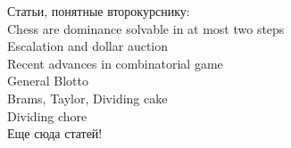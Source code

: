 \documentclass[pdftex,12pt,a4paper]{article}
\begin{document}
Статьи, понятные второкурснику: \\
Chess are dominance solvable in at most two steps \\
Escalation and dollar auction \\
Recent advances in combinatorial game \\
General Blotto \\
Brams, Taylor, Dividing cake \\
Dividing chore \\

Еще сюда статей!



\newpage
\begin{comment}
\section{Ответы}

1.4. а) нет б) да (рисунок) \\
1.5. одну \\

1.8. а) верно б) неверно в) неверно \\
1.9. 7:1 \\

2.1. а) $t_{2}$ \\
2.5. возможная матрица: $\begin{array}{c|cc}
& + & - \\
\hline
+ & (0;0) & (1;-1) \\
- & (-1;1) & (0;0) \\
\end{array}$, NE - $(+;+)$ \\
Мораль: можно добится нужного исхода голосования пообещав деньги, но не выплачивая ни копейки. \\
2.7. $u_{1}(x_{1},x_{2})=\frac{3}{4}(x_{1}+x_{2})-x_{1}$ \\
$u_{2}(x_{1},x_{2})=\frac{3}{4}(x_{1}+x_{2})-x_{2}$ \\
NE - $(x_{1}=0,x_{2}=0)$ \\
2.8. а) верно б) верно в) Если стратегию можно вычеркнуть, то сделать это никогда не поздно \\
2.9. нет \\
2.10. а) называемая им цена б) верно \\


\end{comment}
\end{document}
